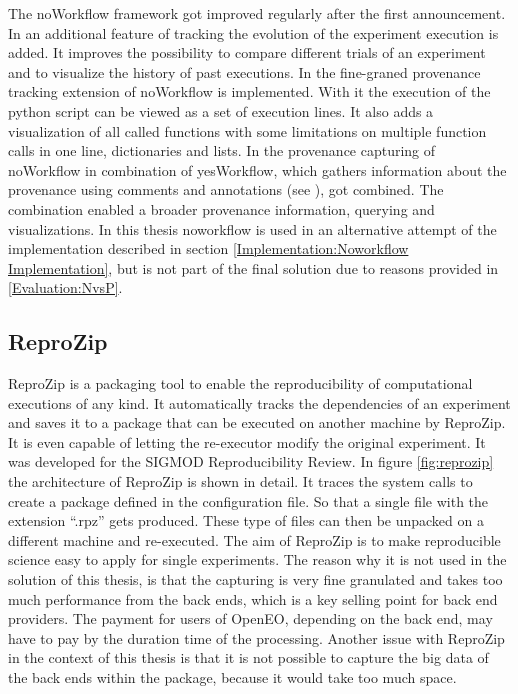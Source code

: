 \documentclass[draft,final]{vutinfth} %
\begin{document}
The noWorkflow framework got improved regularly after the first announcement. In \cite{Pimentel2016TrackingAA} an additional feature of tracking the evolution of the experiment execution is added. It improves the possibility to compare different trials of an experiment and to visualize the history of past executions. In \cite{Pimentel:2016:FPC:3090188.3090214} the fine-graned provenance tracking extension of noWorkflow is implemented. With it the execution of the python script can be viewed as a set of execution lines. It also adds a visualization of all called functions with some limitations on multiple function calls in one line, dictionaries and lists. In \cite{69bac1252a684629baa43b48e350068d} the provenance capturing of noWorkflow in combination of yesWorkflow, which gathers information about the provenance using comments and annotations (see \cite{192094}), got combined. The combination enabled a broader provenance information, querying and visualizations. 
In this thesis noworkflow is used in an alternative attempt of the implementation described in section \ref{Implementation:Noworkflow Implementation}, but is not part of the final solution due to reasons provided in \ref{Evaluation:NvsP}.

\subsection{ReproZip}\label{ReproZip}
ReproZip is a packaging tool to enable the reproducibility of computational executions of any kind. It automatically tracks the dependencies of an experiment and saves it to a package that can be executed on another machine by ReproZip. It is even capable of letting the re-executor modify the original experiment. It was developed for the SIGMOD Reproducibility Review. In figure \ref{fig:reprozip} the architecture of ReproZip is shown in detail. It traces the system calls to create a package defined in the configuration file. So that a single file with the extension “.rpz” gets produced. These type of files can then be unpacked on a different machine and re-executed. The aim of ReproZip is to make reproducible science easy to apply for single experiments. \cite{29c5846926a4497d95f276604cb0368c} The reason why it is not used in the solution of this thesis, is that the capturing is very fine granulated and takes too much performance from the back ends, which is a key selling point for back end providers. The payment for users of OpenEO, depending on the back end, may have to pay by the duration time of the processing. Another issue with ReproZip in the context of this thesis is that it is not possible to capture the big data of the back ends within the package, because it would take too much space.  
\end{document}
